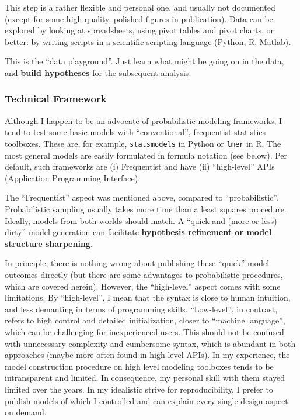 This step is a rather flexible and personal one, and usually not documented (except for some high quality, polished figures in publication).
Data can be explored by looking at spreadsheets, using pivot tables and pivot charts, or better: by writing scripts in a scientific scripting language (Python, R, Matlab).

This is the ``data playground''.
Just learn what might be going on in the data, and \textbf{build hypotheses} for the subsequent analysis.


\subsubsection{Technical Framework}
\label{workflow:framework}
Although I happen to be an advocate of probabilistic modeling frameworks, I tend to test some basic models with ``conventional'', frequentist statistics toolboxes.
These are, for example, \texttt{statsmodels} in Python or \texttt{lmer} in R.
The most general models are easily formulated in formula notation (see below).
Per default, such frameworks are (i) Frequentist and have (ii) ``high-level'' APIs (Application Programming Interface).

The ``Frequentist'' aspect was mentioned above, compared to ``probabilistic''.
Probabilistic sampling usually takes more time than a least squares procedure.
Ideally, models from both worlds should match.
A ``quick and (more or less) dirty'' model generation can facilitate \textbf{hypothesis refinement or model structure sharpening}.

In principle, there is nothing wrong about publishing these ``quick'' model outcomes directly (but there are some advantages to probabilistic procedures, which are covered herein).
However, the ``high-level'' aspect comes with some limitations.
By ``high-level'', I mean that the syntax is close to human intuition, and less demanting in terms of programming skills.
``Low-level'', in contrast, refers to high control and detailed initialization, closer to ``machine language'', which can be challenging for inexperienced users.
This should not be confused with unnecessary complexity and cumbersome syntax, which is abundant in both approaches (maybe more often found in high level APIs).
In my experience, the model construction procedure on high level modeling toolboxes tends to be intransparent and limited.
In consequence, my personal skill with them stayed limited over the years.
In my idealistic strive for reproducibility, I prefer to publish models of which I controlled and can explain every single design aspect on demand.

